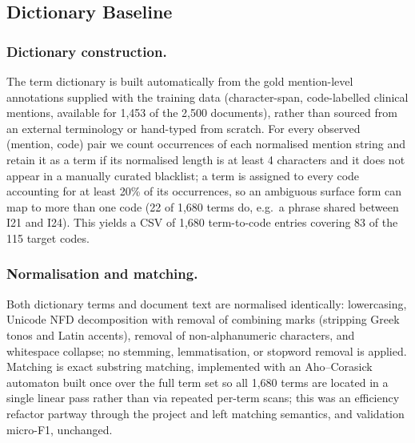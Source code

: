 \subsection{Dictionary Baseline}
\label{subsec:dict}

\subsubsection{Dictionary construction.}
The term dictionary is built automatically from the gold mention-level annotations
supplied with the training data (character-span, code-labelled clinical mentions,
available for 1,453 of the 2,500 documents), rather than sourced from an external
terminology or hand-typed from scratch. For every observed (mention, code) pair we
count occurrences of each normalised mention string and retain it as a term if its
normalised length is at least 4 characters and it does not appear in a manually
curated blacklist; a term is assigned to every code accounting for at least 20\% of
its occurrences, so an ambiguous surface form can map to more than one code (22 of
1,680 terms do, e.g.\ a phrase shared between I21 and I24). This yields a CSV of
1,680 term-to-code entries covering 83 of the 115 target codes.

\subsubsection{Normalisation and matching.}
Both dictionary terms and document text are normalised identically: lowercasing,
Unicode NFD decomposition with removal of combining marks (stripping Greek tonos and
Latin accents), removal of non-alphanumeric characters, and whitespace collapse; no
stemming, lemmatisation, or stopword removal is applied. Matching is exact substring
matching, implemented with an Aho--Corasick automaton built once over the full term
set so all 1,680 terms are located in a single linear pass rather than via repeated
per-term scans; this was an efficiency refactor partway through the project and left
matching semantics, and validation micro-F1, unchanged.

